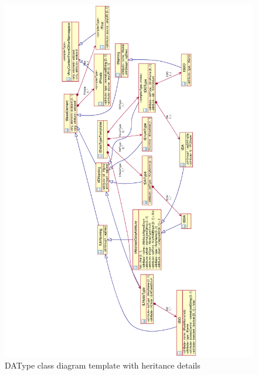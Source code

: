 \begin{landscape}
	\begin{figure}
	  \includegraphics[angle=-90, width=1.0\linewidth]{chapters/ch-scl/figures/SCL-uml-DATypeTemplate-Deept2}
	  \caption{DAType class diagram template with heritance details}  
	  \label{fig:pdf-SCL-uml-DATypeTemplate-Deept2}
	\end{figure}
\end{landscape}

